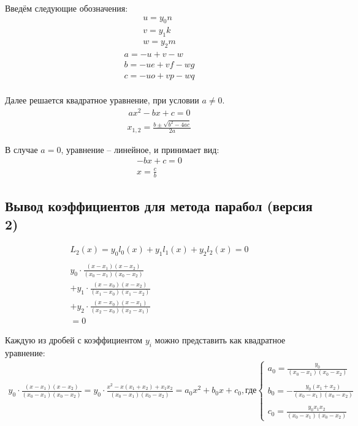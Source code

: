 \documentclass[a4paper]{article}
\begin{document}
Введём следующие обозначения:
\begin{align*}
    u = y_0n \\
    v = y_1k \\
    w = y_2m
\end{align*}
\begin{align*}
    a = -u + v - w \\
    b = -ue + vf - wg \\
    c = -uo + vp - wq \\
\end{align*}

Далее решается квадратное уравнение, при условии $a \neq 0$.
\begin{align*}
    ax^2 - bx + c = 0
\end{align*}
\begin{align*}
    x_{1,2} = \frac{b \pm \sqrt{b^2 - 4ac}}{2a}
\end{align*}

В случае $a = 0$, уравнение -- линейное, и принимает вид:
\begin{align*}
    -bx + c = 0 \\
    x = \frac{c}{b}
\end{align*}

\subsection*{Вывод коэффициентов для метода парабол (версия 2)}

\begin{align*}
    L_2(x) = y_0l_0(x) + y_1l_1(x) + y_2l_2(x) = 0 \\
    \\
    y_0 \cdot \frac{(x - x_1)(x - x_2)}{(x_0 - x_1)(x_0 - x_2)} \\
    + y_1 \cdot \frac{(x - x_0)(x - x_2)}{(x_1 - x_0)(x_1 - x_2)} \\
    + y_2 \cdot \frac{(x - x_0)(x - x_1)}{(x_2 - x_0)(x_2 - x_1)} \\
    = 0
\end{align*}

Каждую из дробей с коэффициентом $y_i$ можно представить как квадратное уравнение:
\begin{align*}
    y_0 \cdot \frac{(x - x_1)(x - x_2)}{(x_0 - x_1)(x_0 - x_2)} = y_0 \cdot \frac{x^2 - x(x_1 + x_2) + x_1x_2}{(x_0 - x_1)(x_0 - x_2)} = a_0x^2 + b_0x + c_0, \text{где}
    \begin{cases}
        a_0 = \displaystyle\frac{y_0}{(x_0 - x_1)(x_0 - x_2)} \\
        \\
        b_0 = -\displaystyle\frac{y_0(x_1 + x_2)}{(x_0 - x_1)(x_0 - x_2)} \\
        \\
        c_0 = \displaystyle\frac{y_0x_1x_2}{(x_0 - x_1)(x_0 - x_2)}
    \end{cases}
\end{align*}
\end{document}
